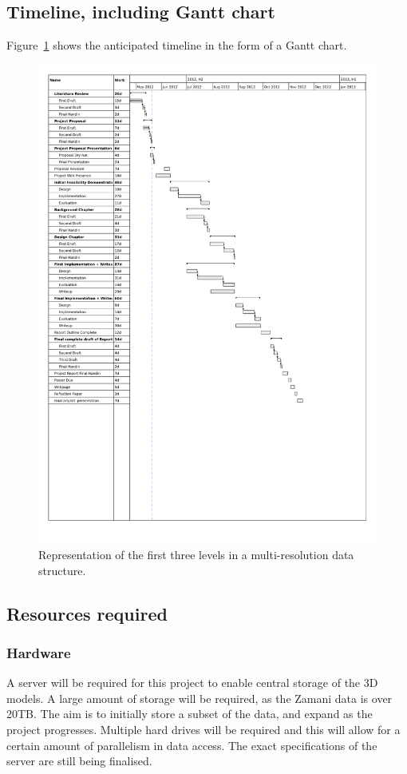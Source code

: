 \documentclass[12pt,a4paper]{article}
\begin{document}
\subsection{Timeline, including Gantt chart}
Figure~\ref{gant} shows the anticipated timeline in the form of a Gantt chart.
\begin{figure}[h!]
\centering
    \includegraphics[width=1\textwidth]{gantt1.pdf}
    \caption{Representation of the first three levels in a multi-resolution data structure.}
    \label{gant}
\end{figure}

\subsection{Resources required}
\subsubsection*{Hardware}
A server will be required for this project to enable central storage of the 3D models.
A large amount of storage will be required, as the Zamani data is over 20TB. The aim
is to initially store a subset of the data, and expand as the project progresses.
Multiple hard drives will be required and this will allow for a certain amount of
parallelism in data access. The exact specifications of the server are still
being finalised.
\end{document}
